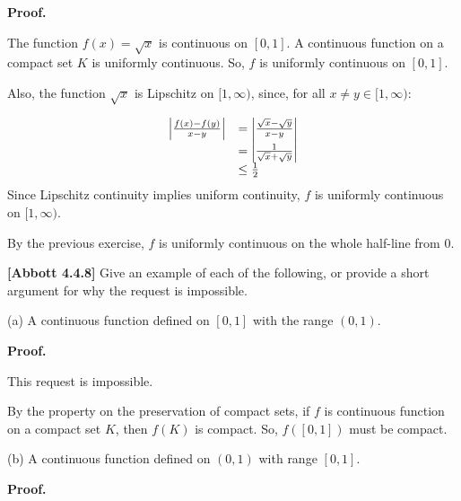 \documentclass[10pt]{article}
\begin{document}
\textbf{Proof.}



The function $\displaystyle f( x) =\sqrt{x}$ is continuous on $\displaystyle [ 0,1]$. A continuous function on a compact set $\displaystyle K$ is uniformly continuous. So, $\displaystyle f$ is uniformly continuous on $\displaystyle [ 0,1]$.



Also, the function $\displaystyle \sqrt{x}$ is Lipschitz on $\displaystyle [ 1,\infty )$, since, for all $\displaystyle x\neq y\in [ 1,\infty )$:


\begin{equation*}
\begin{array}{ c l }
\left| \frac{f( x) -f( y)}{x-y}\right|  & =\left| \frac{\sqrt{x} -\sqrt{y}}{x-y}\right| \\
 & =\left| \frac{1}{\sqrt{x} +\sqrt{y}}\right| \\
 & \leq \frac{1}{2}
\end{array}
\end{equation*}
Since Lipschitz continuity implies uniform continuity, $\displaystyle f$ is uniformly continuous on $\displaystyle [ 1,\infty )$.



By the previous exercise, $\displaystyle f$ is uniformly continuous on the whole half-line from $\displaystyle 0.$



\textbf{[Abbott 4.4.8]} Give an example of each of the following, or provide a short argument for why the request is impossible.



(a) A continuous function defined on $\displaystyle [ 0,1]$ with the range $\displaystyle ( 0,1)$.



\textbf{Proof.}



This request is impossible. 



By the property on the preservation of compact sets, if $\displaystyle f$ is continuous function on a compact set $\displaystyle K$, then $\displaystyle f( K)$ is compact. So, $\displaystyle f([ 0,1])$ must be compact.



(b) A continuous function defined on $\displaystyle ( 0,1)$ with range $\displaystyle [ 0,1]$.



\textbf{Proof.}
\end{document}
